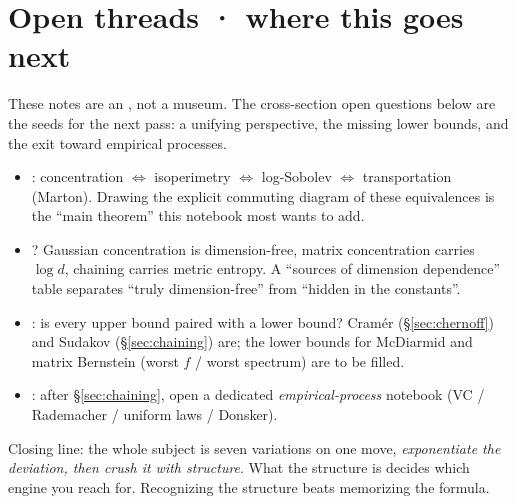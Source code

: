 \section*{Open threads · where this goes next}

\begin{strand}
These notes are an , not a museum. The cross-section open questions below are the
seeds for the next pass: a unifying perspective, the missing lower bounds, and the exit toward
empirical processes.
\end{strand}

\begin{itemize}[leftmargin=1.4em,itemsep=2pt]
  \item {}: concentration $\Leftrightarrow$ isoperimetry $\Leftrightarrow$ log-Sobolev
        $\Leftrightarrow$ transportation (Marton). Drawing the explicit commuting diagram of these equivalences
        is the ``main theorem'' this notebook most wants to add.
  \item {}? Gaussian concentration is dimension-free, matrix concentration carries
        $\log d$, chaining carries metric entropy. A ``sources of dimension dependence'' table separates ``truly
        dimension-free'' from ``hidden in the constants''.
  \item {}: is every upper bound paired with a lower bound? Cramér (§\ref{sec:chernoff}) and
        Sudakov (§\ref{sec:chaining}) are; the lower bounds for McDiarmid and matrix Bernstein (worst $f$ / worst spectrum) are to be filled.
  \item {}: after §\ref{sec:chaining}, open a dedicated \emph{empirical-process} notebook (VC / Rademacher / uniform laws / Donsker).
\end{itemize}

\bigskip
\begin{strand}
Closing line: the whole subject is seven variations on one move, \emph{exponentiate the deviation, then crush it
with structure}. What the structure is decides which engine you reach for. Recognizing the structure beats memorizing the formula.
\end{strand}
